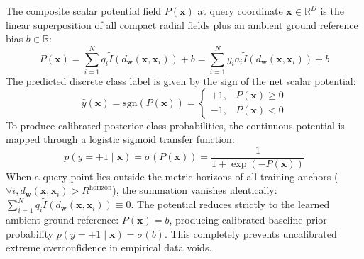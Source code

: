 \documentclass[times, review, 10pt]{elsarticle}
\begin{document}
The composite scalar potential field $P(\mathbf{x})$ at query coordinate $\mathbf{x} \in \mathbb{R}^D$ is the linear superposition of all compact radial fields plus an ambient ground reference bias $b \in \mathbb{R}$:
\begin{equation}
P(\mathbf{x}) = \sum_{i=1}^N q_i \tilde{I}(d_{\mathbf{w}}(\mathbf{x}, \mathbf{x}_i)) + b = \sum_{i=1}^N y_i a_i \tilde{I}(d_{\mathbf{w}}(\mathbf{x}, \mathbf{x}_i)) + b
\label{eq:net_potential}
\end{equation}
The predicted discrete class label is given by the sign of the net scalar potential:
\begin{equation}
\hat{y}(\mathbf{x}) = \mathrm{sgn}(P(\mathbf{x})) = 
\begin{cases}
+1, & P(\mathbf{x}) \ge 0 \\
-1, & P(\mathbf{x}) < 0
\end{cases}
\label{eq:pred_label}
\end{equation}
To produce calibrated posterior class probabilities, the continuous potential is mapped through a logistic sigmoid transfer function:
\begin{equation}
p(y = +1 \mid \mathbf{x}) = \sigma(P(\mathbf{x})) = \frac{1}{1 + \exp(-P(\mathbf{x}))}
\label{eq:sigmoid_prob}
\end{equation}
When a query point lies outside the metric horizons of all training anchors ($\forall i, d_{\mathbf{w}}(\mathbf{x}, \mathbf{x}_i) > R^{\mathrm{horizon}}$), the summation vanishes identically: $\sum_{i=1}^N q_i \tilde{I}(d_{\mathbf{w}}(\mathbf{x}, \mathbf{x}_i)) \equiv 0$. The potential reduces strictly to the learned ambient ground reference: $P(\mathbf{x}) = b$, producing calibrated baseline prior probability $p(y = +1 \mid \mathbf{x}) = \sigma(b)$. This completely prevents uncalibrated extreme overconfidence in empirical data voids.
\end{document}
